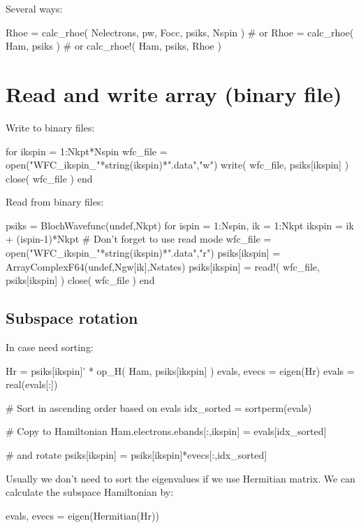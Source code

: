 Several ways:
\begin{juliacode}
Rhoe = calc_rhoe( Nelectrons, pw, Focc, psiks, Nspin )
# or
Rhoe = calc_rhoe( Ham, psiks )
# or
calc_rhoe!( Ham, psiks, Rhoe )
\end{juliacode}

\section{Read and write array (binary file)}

Write to binary files:
\begin{juliacode}
for ikspin = 1:Nkpt*Nspin
    wfc_file = open("WFC_ikspin_"*string(ikspin)*".data","w")
    write( wfc_file, psiks[ikspin] )
    close( wfc_file )
end
\end{juliacode}

Read from binary files:
\begin{juliacode}
psiks = BlochWavefunc(undef,Nkpt)
for ispin = 1:Nspin, ik = 1:Nkpt
    ikspin = ik + (ispin-1)*Nkpt
    # Don't forget to use read mode
    wfc_file = open("WFC_ikspin_"*string(ikspin)*".data","r")
    psiks[ikspin] = Array{ComplexF64}(undef,Ngw[ik],Nstates)
    psiks[ikspin] = read!( wfc_file, psiks[ikspin] )
    close( wfc_file )
end
\end{juliacode}




\subsection*{Subspace rotation}

In case need sorting:
\begin{juliacode}
Hr = psiks[ikspin]' * op_H( Ham, psiks[ikspin] )
evals, evecs = eigen(Hr)
evals = real(evals[:])

# Sort in ascending order based on evals
idx_sorted = sortperm(evals)

# Copy to Hamiltonian
Ham.electrons.ebands[:,ikspin] = evals[idx_sorted]

# and rotate
psiks[ikspin] = psiks[ikspin]*evecs[:,idx_sorted]
\end{juliacode}

Usually we don't need to sort the eigenvalues if we use Hermitian matrix. We can calculate the
subspace Hamiltonian by:
\begin{juliacode}
evals, evecs = eigen(Hermitian(Hr))
\end{juliacode}
